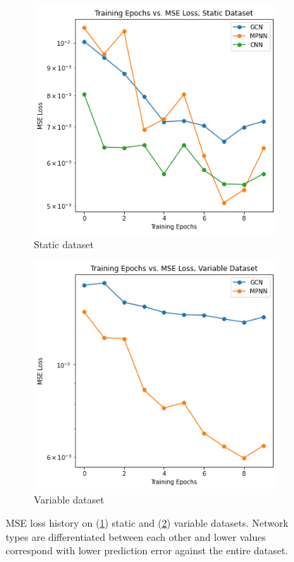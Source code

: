 \documentclass[review]{siamart190516}
\begin{document}
\begin{figure}[h]
  \centering
  \begin{subfigure}{.48\textwidth}
    \includegraphics[width=\textwidth]{figs/static_mse.png}
    \caption{Static dataset}
    \label{subfig:conv_static_mse}
  \end{subfigure}
  \begin{subfigure}{.48\textwidth}
    \includegraphics[width=\textwidth]{figs/variable_mse.png}
    \caption{Variable dataset}
    \label{subfig:conv_variable_mse}
  \end{subfigure}
  \caption{MSE loss history on (\ref{subfig:conv_static_mse}) static and (\ref{subfig:conv_variable_mse}) variable datasets.  Network types are differentiated between each other and lower values correspond with lower prediction error against the entire dataset.}
  \label{fig:conv_train_history}
\end{figure}
\end{document}
